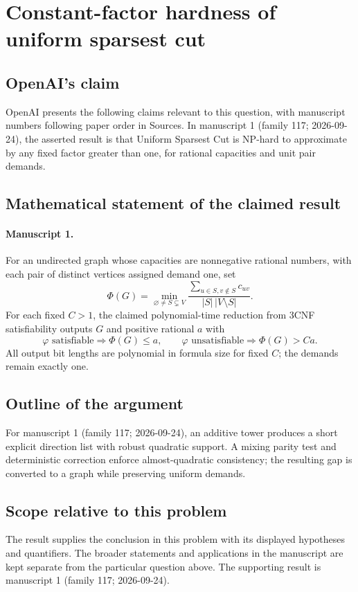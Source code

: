 \documentclass[11pt]{article}
\begin{document}
\section*{Constant-factor hardness of uniform sparsest cut}

\subsection{OpenAI's claim}
OpenAI presents the following claims relevant to this question, with manuscript numbers following paper order in Sources. In manuscript 1 (family 117; 2026-09-24), the asserted result is that Uniform Sparsest Cut is NP-hard to approximate by any fixed factor greater than one, for rational capacities and unit pair demands.

\subsection{Mathematical statement of the claimed result}
\paragraph{Manuscript 1.}
For an undirected graph whose capacities are nonnegative rational numbers, with each pair of distinct vertices assigned demand one, set
\[
 \Phi(G)=\min_{\varnothing\ne S\subsetneq V}
 \frac{\sum_{u\in S,v\notin S}c_{uv}}{|S|\,|V\setminus S|}.
\]
For each fixed $C>1$, the claimed polynomial-time reduction from $3$CNF satisfiability outputs $G$ and positive rational $a$ with
\[
 \varphi\text{ satisfiable}\Rightarrow\Phi(G)\le a,
 \qquad\varphi\text{ unsatisfiable}\Rightarrow\Phi(G)>Ca.
\]
All output bit lengths are polynomial in formula size for fixed $C$; the demands remain exactly one.

\subsection{Outline of the argument}
For manuscript 1 (family 117; 2026-09-24), an additive tower produces a short explicit direction list with robust quadratic support. A mixing parity test and deterministic correction enforce almost-quadratic consistency; the resulting gap is converted to a graph while preserving uniform demands.

\subsection{Scope relative to this problem}
The result supplies the conclusion in this problem with its displayed hypotheses and quantifiers. The broader statements and applications in the manuscript are kept separate from the particular question above. The supporting result is manuscript 1 (family 117; 2026-09-24).
\end{document}
